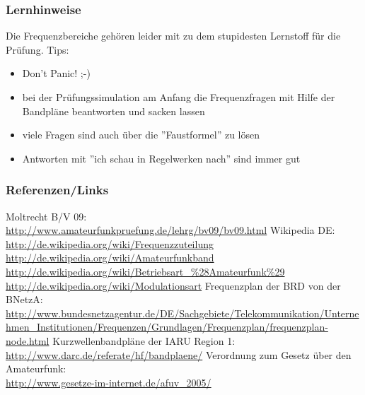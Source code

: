 \begin{frame}
    \frametitle{Lernhinweise}

    Die Frequenzbereiche gehören leider mit zu dem stupidesten Lernstoff für die
    Prüfung. Tips:

    \begin{itemize}
        \item Don't Panic! ;-)
        \item bei der Prüfungssimulation am Anfang die Frequenzfragen mit Hilfe
              der Bandpläne beantworten und sacken lassen
        \item viele Fragen sind auch über die ''Faustformel'' zu lösen
        \item Antworten mit ''ich schau in Regelwerken nach'' sind immer gut
    \end{itemize}

\end{frame}

\renewcommand{\refname}{Referenzen}

\begin{frame}
    \frametitle{Referenzen/Links}
    \hypertarget{refs}{}
    \footnotesize

    \begin{thebibliography}{}
         Moltrecht B/V 09: \\
                        \url{http://www.amateurfunkpruefung.de/lehrg/bv09/bv09.html}
            Wikipedia DE: \\
                        \url{http://de.wikipedia.org/wiki/Frequenzzuteilung} \\
                        \url{http://de.wikipedia.org/wiki/Amateurfunkband} \\
                        \url{http://de.wikipedia.org/wiki/Betriebsart_\%28Amateurfunk\%29} \\
                        \url{http://de.wikipedia.org/wiki/Modulationsart}
          Frequenzplan der BRD von der BNetzA: \\
                        \url{http://www.bundesnetzagentur.de/DE/Sachgebiete/Telekommunikation/Unternehmen_Institutionen/Frequenzen/Grundlagen/Frequenzplan/frequenzplan-node.html}
          Kurzwellenbandpläne der IARU Region 1: \\
                        \url{http://www.darc.de/referate/hf/bandplaene/}
          Verordnung zum Gesetz über den Amateurfunk: \\
                        \url{http://www.gesetze-im-internet.de/afuv_2005/}
    \end{thebibliography} 
   
\end{frame}


